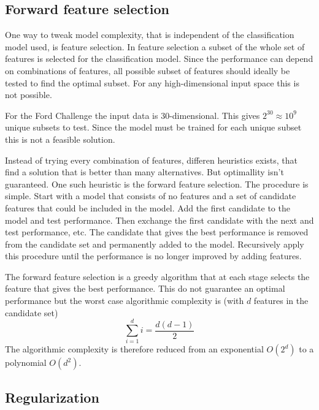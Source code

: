 \subsection{Forward feature selection}
One way to tweak model complexity, that is independent of the classification model used, is feature selection. In feature selection a subset of the whole set of features is selected for the classification model. Since the performance can depend on combinations of features, all possible subset of features should ideally be tested to find the optimal subset. For any high-dimensional input space this is not possible.
\begin{Exa}
    For the Ford Challenge the input data is 30-dimensional. This gives $2^30\approx10^9$ unique subsets to test. Since the model must be trained for each unique subset this is not a feasible solution.
\end{Exa}
Instead of trying every combination of features, differen heuristics exists, that find a solution that is better than many alternatives. But optimallity isn't guaranteed. One such heuristic is the forward feature selection. The procedure is simple. Start with a model that consists of no features and a set of candidate features that could be included in the model. Add the first candidate to the model and test performance. Then exchange the first candidate with the next and test performance, etc. The candidate that gives the best performance is removed from the candidate set and permanently added to the model. Recursively apply this procedure until the performance is no longer improved by adding features. \par
The forward feature selection is a greedy algorithm that at each stage selects the feature that gives the best performance. This do not guarantee an optimal performance but the worst case algorithmic complexity is (with $d$ features in the candidate set)
\[
    \sum_{i=1}^d i = \frac{d(d-1)}{2}
\]
The algorithmic complexity is therefore reduced from an exponential $O(2^d)$ to a polynomial $O(d^2)$.

\subsection{Regularization}
